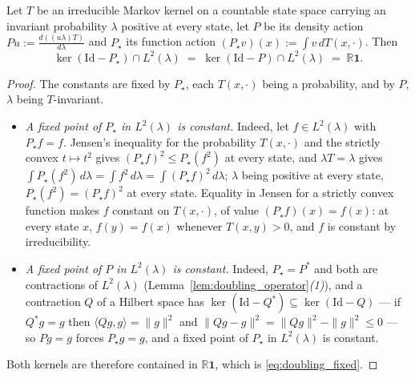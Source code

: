\begin{lemma}\label{lem:doubling_fixed_points}
Let $T$ be an irreducible Markov kernel on a countable state space carrying an invariant
probability $\lambda$ positive at every state, let $P$ be its density action
$Pu:=\frac{d\left((u\lambda)T\right)}{d\lambda}$ and $P_\star$ its function action
$(P_\star v)(x):=\int v\,dT(x,\cdot)$. Then
\begin{equation}\label{eq:doubling_fixed}
    \ker\left(\mathrm{Id}-P_\star\right)\cap L^2(\lambda)
    \;=\;\ker\left(\mathrm{Id}-P\right)\cap L^2(\lambda)
    \;=\;\mathbb R\mathbf 1 .
\end{equation}
\end{lemma}

\begin{proof}
The constants are fixed by $P_\star$, each $T(x,\cdot)$ being a probability, and by $P$,
$\lambda$ being $T$-invariant.
\begin{itemize}
    \item \emph{A fixed point of $P_\star$ in $L^2(\lambda)$ is constant.} Indeed, let
    $f\in L^2(\lambda)$ with $P_\star f=f$. Jensen's inequality for the probability $T(x,\cdot)$
    and the strictly convex $t\mapsto t^2$ gives $(P_\star f)^2\leq P_\star(f^2)$ at every
    state, and $\lambda T=\lambda$ gives
    $\int P_\star(f^2)\,d\lambda=\int f^2\,d\lambda=\int(P_\star f)^2\,d\lambda$; $\lambda$
    being positive at every state, $P_\star(f^2)=(P_\star f)^2$ at every state. Equality in
    Jensen for a strictly convex function makes $f$ constant on $T(x,\cdot)$, of value
    $(P_\star f)(x)=f(x)$: at every state $x$, $f(y)=f(x)$ whenever $T(x,y)>0$, and $f$ is
    constant by irreducibility.
    \item \emph{A fixed point of $P$ in $L^2(\lambda)$ is constant.} Indeed, $P_\star=P^*$ and
    both are contractions of $L^2(\lambda)$ (Lemma~\ref{lem:doubling_operator}\emph{(1)}), and
    a contraction $Q$ of a Hilbert space has
    $\ker(\mathrm{Id}-Q^*)\subseteq\ker(\mathrm{Id}-Q)$ --- if $Q^*g=g$ then
    $\langle Qg,g\rangle=\|g\|^2$ and $\|Qg-g\|^2=\|Qg\|^2-\|g\|^2\leq0$ --- so $Pg=g$ forces
    $P_\star g=g$, and a fixed point of $P_\star$ in $L^2(\lambda)$ is constant.
\end{itemize}
Both kernels are therefore contained in $\mathbb R\mathbf 1$, which is
\eqref{eq:doubling_fixed}.
\end{proof}

